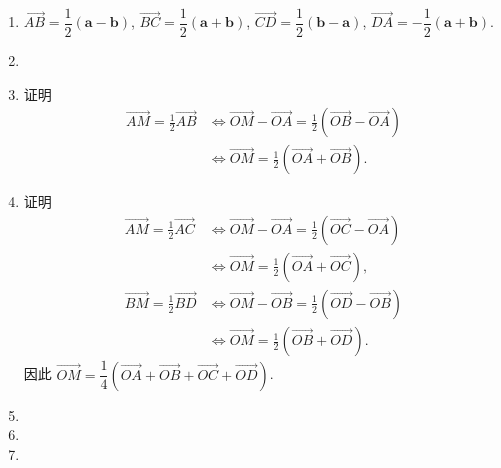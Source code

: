 \documentclass[a4paper, 11pt]{ctexart}
\begin{document}
\begin{enumerate}
    \item %
        $\overrightarrow{AB} = \dfrac12(\boldsymbol{a} - \boldsymbol{b})$,
        $\overrightarrow{BC} = \dfrac12(\boldsymbol{a} + \boldsymbol{b})$,
        $\overrightarrow{CD} = \dfrac12(\boldsymbol{b} - \boldsymbol{a})$,
        $\overrightarrow{DA} = -\dfrac12(\boldsymbol{a} + \boldsymbol{b})$.
    \item %
    
    \item %
        {\heiti 证明}\quad \begin{align*}
            \overrightarrow{AM} = \frac12\overrightarrow{AB}
            &\Leftrightarrow
            \overrightarrow{OM} - \overrightarrow{OA} = \frac12(\overrightarrow{OB} - \overrightarrow{OA}) \\
            &\Leftrightarrow
            \overrightarrow{OM} = \frac12(\overrightarrow{OA} + \overrightarrow{OB}).
        \end{align*}
    \item %
        {\heiti 证明}\quad \begin{align*}
            \overrightarrow{AM} = \frac12\overrightarrow{AC}
            &\Leftrightarrow
            \overrightarrow{OM} - \overrightarrow{OA} = \frac12(\overrightarrow{OC} - \overrightarrow{OA}) \\
            &\Leftrightarrow
            \overrightarrow{OM} = \frac12(\overrightarrow{OA} + \overrightarrow{OC}), \\
            \overrightarrow{BM} = \frac12\overrightarrow{BD}
            &\Leftrightarrow
            \overrightarrow{OM} - \overrightarrow{OB} = \frac12(\overrightarrow{OD} - \overrightarrow{OB}) \\
            &\Leftrightarrow
            \overrightarrow{OM} = \frac12(\overrightarrow{OB} + \overrightarrow{OD}).
        \end{align*}
        因此 $\overrightarrow{OM} = \dfrac14(\overrightarrow{OA} + \overrightarrow{OB} + \overrightarrow{OC} + \overrightarrow{OD})$.
    \item %
    \item %
    \item %
\end{enumerate}
\end{document}
